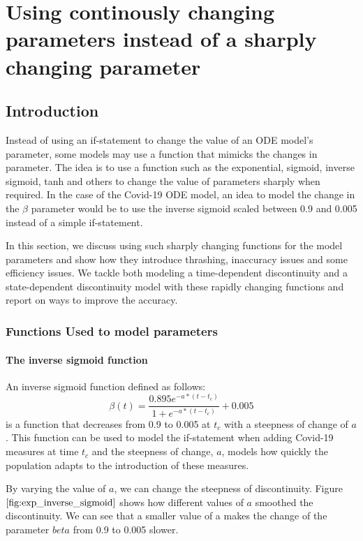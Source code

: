 \section{Using continously changing parameters instead of a sharply changing parameter}

\subsection{Introduction}
Instead of using an if-statement to change the value of an ODE model's parameter, some models may use a function that mimicks the changes in parameter. The idea is to use a function such as the exponential, sigmoid, inverse sigmoid, tanh and others to change the value of parameters sharply when required. In the case of the Covid-19 ODE model, an idea to model the change in the $\beta$ parameter would be to use the inverse sigmoid scaled between 0.9 and 0.005 instead of a simple if-statement. 


In this section, we discuss using such sharply changing functions for the model parameters and show how they introduce thrashing, inaccuracy issues and some efficiency issues. We tackle both modeling a time-dependent discontinuity and a state-dependent discontinuity model with these rapidly changing functions and report on ways to improve the accuracy.

\subsubsection{Functions Used to model parameters}
\paragraph{The inverse sigmoid function}
An inverse sigmoid function defined as follows:
\begin{equation}
    \beta(t) =     \frac{0.895e^{-a*(t - t_c)}}{1 + e^{-a*(t - t_c)}} + 0.005
\end{equation}
is a function that decreases from 0.9 to 0.005 at $t_c$ with a steepness of change of $a$.
This function can be used to model the if-statement when adding Covid-19 measures at time $t_c$ and the steepness of change, $a$, models how quickly the population adapts to the introduction of these measures.

By varying the value of $a$, we can change the steepness of discontinuity. Figure $\ref{fig:exp_inverse_sigmoid}$ shows how different values of $a$ smoothed the discontinuity. We can see that a smaller value of a makes the change of the parameter $beta$ from 0.9 to 0.005 slower.

